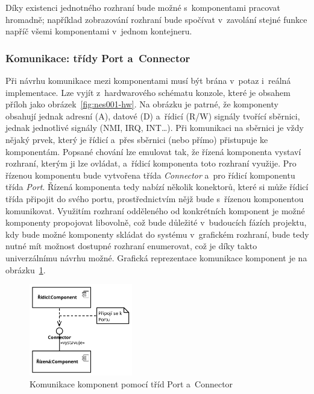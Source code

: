 Díky existenci jednotného rozhraní bude možné s~komponentami pracovat hromadně; například zobrazování rozhraní bude spočívat v~zavolání stejné funkce napříč všemi komponentami v~jednom kontejneru.

\subsubsection{Komunikace: třídy Port a~Connector}
\label{sec:port-connector}
Při návrhu komunikace mezi komponentami musí být brána v~potaz i~reálná implementace. Lze vyjít z~hardwarového schématu konzole, které je obsahem příloh jako obrázek~\ref{fig:nes001-hw}. Na obrázku je patrné, že komponenty obsahují jednak adresní (A), datové (D) a~řídicí  (R/W) signály tvořící sběrnici, jednak jednotlivé signály (NMI, IRQ, INT\dots). Při komunikaci na sběrnici je vždy nějaký prvek, který je řídicí a~přes sběrnici (nebo přímo) přistupuje ke komponentám. Popsané chování lze emulovat tak, že řízená komponenta vystaví rozhraní, kterým ji lze ovládat, a~řídicí komponenta toto rozhraní využije. Pro řízenou komponentu bude vytvořena třída \emph{Connector} a~pro řídicí komponentu třída \emph{Port}. Řízená komponenta tedy nabízí několik konektorů, které si může řídicí třída připojit do svého portu, prostřednictvím nějž bude s~řízenou komponentou komunikovat. Využitím rozhraní odděleného od konkrétních komponent je možné komponenty propojovat libovolně, což bude důležité v~budoucích fázích projektu, kdy bude možné komponenty skládat do systému v~grafickém rozhraní, bude tedy nutné mít možnost dostupné rozhraní enumerovat, což je díky takto univerzálnímu návrhu možné. Grafická reprezentace komunikace komponent je na obrázku~\ref{fig:navrh-komunikace-komponent}.

\begin{figure}[ht!]
	\centering
	\caption{Komunikace komponent pomocí tříd Port a~Connector}\label{fig:navrh-komunikace-komponent}
	\includegraphics[width=0.4\textwidth]{images/port_connector.pdf}
\end{figure}


